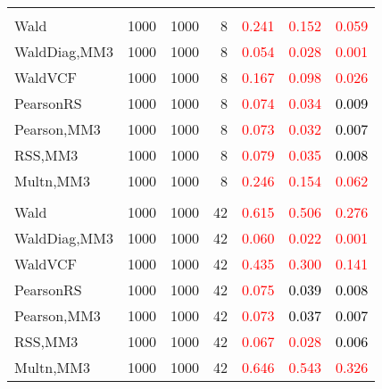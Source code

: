 \documentclass[
]{article}
\begin{document}
\begin{table}[H]
{\begin{tabular}[t]{lrrrrrr}
\addlinespace[0.3em]
\multicolumn{7}{l}{\textbf{2F 10V}}\\
\hspace{1em}Wald & 1000 & 1000 & 8 & \textcolor{red}{0.241} & \textcolor{red}{0.152} & \textcolor{red}{0.059}\\
\hspace{1em}WaldDiag,MM3 & 1000 & 1000 & 8 & \textcolor{red}{0.054} & \textcolor{red}{0.028} & \textcolor{red}{0.001}\\
\hspace{1em}WaldVCF & 1000 & 1000 & 8 & \textcolor{red}{0.167} & \textcolor{red}{0.098} & \textcolor{red}{0.026}\\
\hspace{1em}PearsonRS & 1000 & 1000 & 8 & \textcolor{red}{0.074} & \textcolor{red}{0.034} & \textcolor{black}{0.009}\\
\hspace{1em}Pearson,MM3 & 1000 & 1000 & 8 & \textcolor{red}{0.073} & \textcolor{red}{0.032} & \textcolor{black}{0.007}\\
\hspace{1em}RSS,MM3 & 1000 & 1000 & 8 & \textcolor{red}{0.079} & \textcolor{red}{0.035} & \textcolor{black}{0.008}\\
\hspace{1em}Multn,MM3 & 1000 & 1000 & 8 & \textcolor{red}{0.246} & \textcolor{red}{0.154} & \textcolor{red}{0.062}\\
\addlinespace[0.3em]
\multicolumn{7}{l}{\textbf{3F 15V}}\\
\hspace{1em}Wald & 1000 & 1000 & 42 & \textcolor{red}{0.615} & \textcolor{red}{0.506} & \textcolor{red}{0.276}\\
\hspace{1em}WaldDiag,MM3 & 1000 & 1000 & 42 & \textcolor{red}{0.060} & \textcolor{red}{0.022} & \textcolor{red}{0.001}\\
\hspace{1em}WaldVCF & 1000 & 1000 & 42 & \textcolor{red}{0.435} & \textcolor{red}{0.300} & \textcolor{red}{0.141}\\
\hspace{1em}PearsonRS & 1000 & 1000 & 42 & \textcolor{red}{0.075} & \textcolor{black}{0.039} & \textcolor{black}{0.008}\\
\hspace{1em}Pearson,MM3 & 1000 & 1000 & 42 & \textcolor{red}{0.073} & \textcolor{black}{0.037} & \textcolor{black}{0.007}\\
\hspace{1em}RSS,MM3 & 1000 & 1000 & 42 & \textcolor{red}{0.067} & \textcolor{red}{0.028} & \textcolor{black}{0.006}\\
\hspace{1em}Multn,MM3 & 1000 & 1000 & 42 & \textcolor{red}{0.646} & \textcolor{red}{0.543} & \textcolor{red}{0.326}\\
\bottomrule
\end{tabular}}
\endgroup{}
\end{table}
\end{document}
